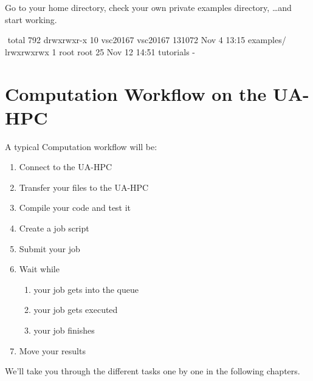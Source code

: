 Go to your home directory, check your own private examples directory, \dots  and start working.

\begin{prompt}
$ %
$ %
total 792
drwxrwxr-x 10 vsc20167 vsc20167 131072 Nov  4 13:15 examples/
lrwxrwxrwx 1  root     root         25 Nov 12 14:51 tutorials -%
\end{prompt}

\section{Computation Workflow on the UA-HPC}
\label{sec:compuation-workflow-on-the-hpc}

A typical Computation workflow will be:

\begin{enumerate}
  \item  Connect to the UA-HPC
  \item  Transfer your files to the UA-HPC
  \item  Compile your code and test it
  \item  Create a job script
  \item  Submit your job
  \item  Wait while
  \begin{enumerate}
    \item  your job gets into the queue
    \item  your job gets executed
    \item  your job finishes
  \end{enumerate}
  \item  Move your results
\end{enumerate}

We'll take you through the different tasks one by one in the following
chapters.
